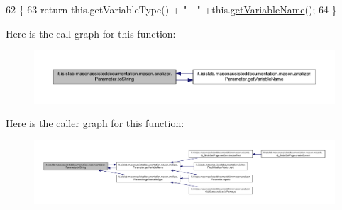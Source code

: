 \begin{DoxyCode}
62                             \{
63         \textcolor{keywordflow}{return} this.getVariableType() + \textcolor{stringliteral}{" - "} +this.\hyperlink{classit_1_1isislab_1_1masonassisteddocumentation_1_1mason_1_1analizer_1_1_parameter_aeb5c13b8a5bb75063046297b440da70b}{getVariableName}();
64     \}
\end{DoxyCode}


Here is the call graph for this function\-:
\nopagebreak
\begin{figure}[H]
\begin{center}
\leavevmode
\includegraphics[width=350pt]{classit_1_1isislab_1_1masonassisteddocumentation_1_1mason_1_1analizer_1_1_parameter_a35e65b1fda861615ad93b81d814dda05_cgraph}
\end{center}
\end{figure}




Here is the caller graph for this function\-:
\nopagebreak
\begin{figure}[H]
\begin{center}
\leavevmode
\includegraphics[width=350pt]{classit_1_1isislab_1_1masonassisteddocumentation_1_1mason_1_1analizer_1_1_parameter_a35e65b1fda861615ad93b81d814dda05_icgraph}
\end{center}
\end{figure}




